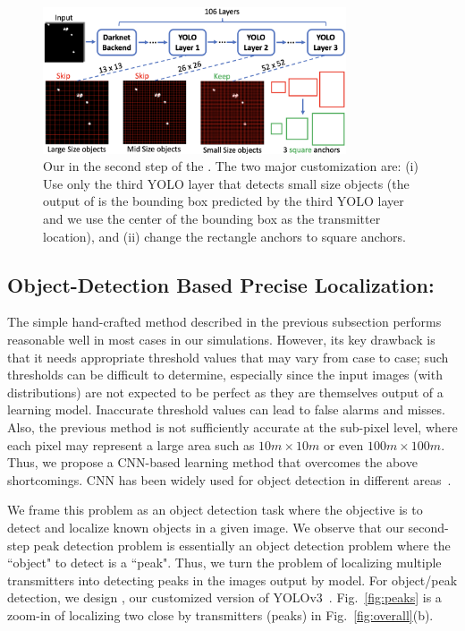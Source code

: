 \begin{figure}
	\centering
	\includegraphics[width=0.8\textwidth]{chapters/wowmom-pmc/figures/yolo.png}
	\caption{Our \yolocust in the second step of the \our. The two major customization are: (i) Use only the third YOLO layer that detects small size objects (the output of \yolocust is the bounding box predicted by the third YOLO layer and we use the center of the bounding box as the transmitter location), and (ii) change the rectangle anchors to square anchors.}
	\label{fig:yolo}
\end{figure}

\subsection{Object-Detection Based Precise Localization: \yolocust} 

The simple hand-crafted method described in the previous subsection performs reasonable well in most cases in our simulations. 
However, its key drawback is that it needs appropriate threshold values that may vary from case to case; such thresholds can be difficult to determine, especially since
the input images (with distributions) are not expected to be perfect as they are themselves output of a learning model.
Inaccurate threshold values can lead to false alarms and misses. 
Also, the previous method is not sufficiently accurate at the sub-pixel level, where
each pixel may represent a large area such as $10m \times 10m$ or even $100m \times 100m$. Thus,
we propose a CNN-based learning method that overcomes the above shortcomings.  
CNN has been widely used for object detection in different areas~\cite{objectdetectionsurvey,alizadeh21}.

We frame this problem as an object detection task where the objective is to detect and localize
known objects in a given image. We observe that our second-step peak detection problem is essentially an object detection problem where the ``object" to detect is a ``peak".
Thus, we turn the \mtl problem of localizing multiple transmitters into detecting 
peaks in the images output by \imgimg model. 
For object/peak detection, we design \yolocust, our customized version of YOLOv3~\cite{yolov3}.
Fig.~\ref{fig:peaks} is a zoom-in of localizing two close by transmitters (peaks) in Fig.~\ref{fig:overall}(b).


